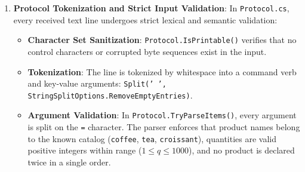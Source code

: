 \documentclass[11pt,a4paper]{article}
\begin{document}
\begin{enumerate}
\begin{lstlisting}[language={[Sharp]C}]
    for (int i = 0; i < count; i++){
        byte b = buffer[i];
        if (b == (byte)'\n'){
            if (!skipping){
                HandleMessage(Encoding.UTF8.GetString(message, 0, length));
            }
            length = 0;
            skipping = false;
        } else if (skipping){
            // Ignore bytes until newline
        } else if (length == MaxMessageLength){
            SendError("message too long, maximum is " + MaxMessageLength + " bytes");
            skipping = true;
        } else {
            message[length++] = b;
        }
    }
}
    \end{lstlisting}
    This state machine solves three critical edge cases:
    \begin{itemize}
        \item \textbf{Partial Messages}: When a message is split across packets, bytes are stored in \texttt{message} across successive \texttt{Receive()} calls until \texttt{\textbackslash n} is encountered.
        \item \textbf{Coalesced Messages}: If multiple messages arrive in one read buffer, the inner loop processes the first, resets \texttt{length = 0}, and seamlessly parses subsequent messages.
        \item \textbf{Buffer Overflow Protection}: If a malicious or malformed client transmits a payload exceeding 1024 bytes without a newline, the parser enters the \texttt{skipping} state, transmits an error, and discards input until the next delimiter. Carriage returns (\texttt{\textbackslash r}) from Telnet/Windows clients are stripped automatically.
    \end{itemize}

    \item \textbf{Protocol Tokenization and Strict Input Validation}:
    In \texttt{Protocol.cs}, every received text line undergoes strict lexical and semantic validation:
    \begin{itemize}
        \item \textbf{Character Set Sanitization}: \texttt{Protocol.IsPrintable()} verifies that no control characters or corrupted byte sequences exist in the input.
        \item \textbf{Tokenization}: The line is tokenized by whitespace into a command verb and key-value arguments: \texttt{Split(' ', StringSplitOptions.RemoveEmptyEntries)}.
        \item \textbf{Argument Validation}: In \texttt{Protocol.TryParseItems()}, every argument is split on the \texttt{=} character. The parser enforces that product names belong to the known catalog (\texttt{coffee}, \texttt{tea}, \texttt{croissant}), quantities are valid positive integers within range ($1 \le q \le 1000$), and no product is declared twice in a single order.
    \end{itemize}


\end{enumerate}
\end{document}
